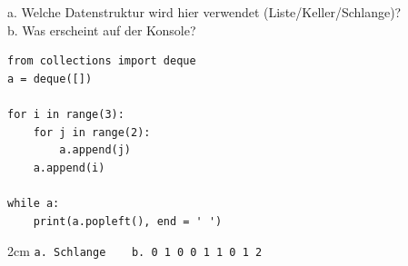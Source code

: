 \question[3]
a. Welche Datenstruktur wird hier verwendet (Liste/Keller/Schlange)? \\
b. Was erscheint auf der Konsole?
 
\begin{lstlisting}
from collections import deque
a = deque([]) 

for i in range(3):
    for j in range(2):
        a.append(j)
    a.append(i)

while a:
    print(a.popleft(), end = ' ')

\end{lstlisting}

\begin{solutionbox}{2cm}
\texttt{a. Schlange  ~~  b. 0 1 0 0 1 1 0 1 2   } 
\end{solutionbox}
